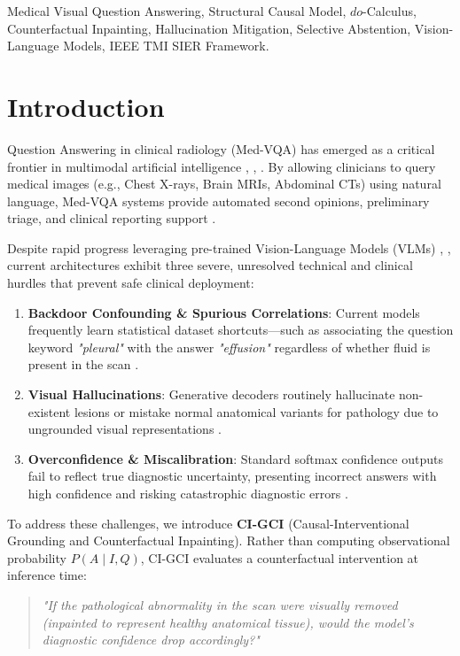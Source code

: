 \documentclass[journal]{IEEEtran}
\begin{document}
\begin{IEEEkeywords}
Medical Visual Question Answering, Structural Causal Model, $do$-Calculus, Counterfactual Inpainting, Hallucination Mitigation, Selective Abstention, Vision-Language Models, IEEE TMI SIER Framework.
\end{IEEEkeywords}

\section{Introduction}
 Question Answering in clinical radiology (Med-VQA) has emerged as a critical frontier in multimodal artificial intelligence \cite{rubin2019}, \cite{he2020}, \cite{chen2021}. By allowing clinicians to query medical images (e.g., Chest X-rays, Brain MRIs, Abdominal CTs) using natural language, Med-VQA systems provide automated second opinions, preliminary triage, and clinical reporting support \cite{gale2020}.

Despite rapid progress leveraging pre-trained Vision-Language Models (VLMs) \cite{li2022}, \cite{liu2023}, current architectures exhibit three severe, unresolved technical and clinical hurdles that prevent safe clinical deployment:
\begin{enumerate}
    \item \textbf{Backdoor Confounding \& Spurious Correlations}: Current models frequently learn statistical dataset shortcuts---such as associating the question keyword \textit{"pleural"} with the answer \textit{"effusion"} regardless of whether fluid is present in the scan \cite{wu2021}.
    \item \textbf{Visual Hallucinations}: Generative decoders routinely hallucinate non-existent lesions or mistake normal anatomical variants for pathology due to ungrounded visual representations \cite{zhang2024}.
    \item \textbf{Overconfidence \& Miscalibration}: Standard softmax confidence outputs fail to reflect true diagnostic uncertainty, presenting incorrect answers with high confidence and risking catastrophic diagnostic errors \cite{guo2017}.
\end{enumerate}

To address these challenges, we introduce \textbf{CI-GCI} (Causal-Interventional Grounding and Counterfactual Inpainting). Rather than computing observational probability $P(A \mid I, Q)$, CI-GCI evaluates a counterfactual intervention at inference time:
\begin{quote}
\textit{"If the pathological abnormality in the scan were visually removed (inpainted to represent healthy anatomical tissue), would the model's diagnostic confidence drop accordingly?"}
\end{quote}
\end{document}
